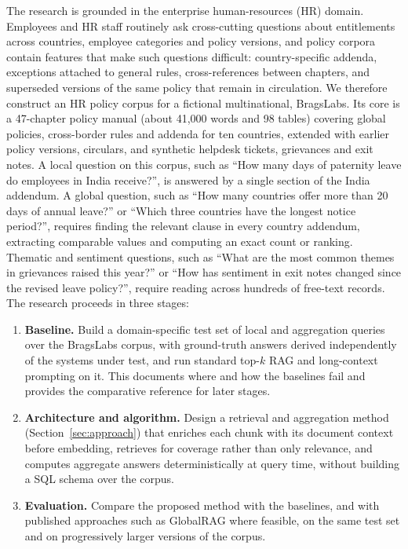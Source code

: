 \documentclass[11pt,letterpaper,oneside]{report}
\begin{document}
The research is grounded in the enterprise human-resources (HR) domain.
Employees and HR staff routinely ask cross-cutting questions about
entitlements across countries, employee categories and policy versions, and
policy corpora contain features that make such questions difficult:
country-specific addenda, exceptions attached to general rules,
cross-references between chapters, and superseded versions of the same policy
that remain in circulation. We therefore construct an HR policy corpus for a
fictional multinational, BragsLabs. Its
core is a 47-chapter policy manual (about 41{,}000 words and 98 tables)
covering global policies, cross-border rules and addenda for ten countries,
extended with earlier policy versions, circulars, and synthetic helpdesk
tickets, grievances and exit notes. A local question on this corpus, such as
``How many days of paternity leave do employees in India receive?'', is
answered by a single section of the India addendum. A global question, such
as ``How many countries offer more than 20 days of annual leave?'' or ``Which
three countries have the longest notice period?'', requires finding the
relevant clause in every country addendum, extracting comparable values and
computing an exact count or ranking. Thematic and sentiment questions, such
as ``What are the most common themes in grievances raised this year?'' or
``How has sentiment in exit notes changed since the revised leave policy?'',
require reading across hundreds of free-text records. The research proceeds in
three stages:
\begin{enumerate}
  \item \textbf{Baseline.} Build a domain-specific test set of local and
  aggregation queries over the BragsLabs corpus, with ground-truth answers
  derived independently of the systems under test, and run standard top-$k$
  RAG and long-context prompting on it. This documents where and how the
  baselines fail and provides the comparative reference for later stages.
  \item \textbf{Architecture and algorithm.} Design a retrieval and
  aggregation method (Section~\ref{sec:approach}) that enriches each chunk
  with its document context before embedding, retrieves for coverage rather
  than only relevance, and computes aggregate answers deterministically at
  query time, without building a SQL schema over the corpus.
  \item \textbf{Evaluation.} Compare the proposed method with the baselines,
  and with published approaches such as GlobalRAG \citep{luo2025globalrag}
  where feasible, on the same test set and on progressively larger versions
  of the corpus.
\end{enumerate}
\end{document}
